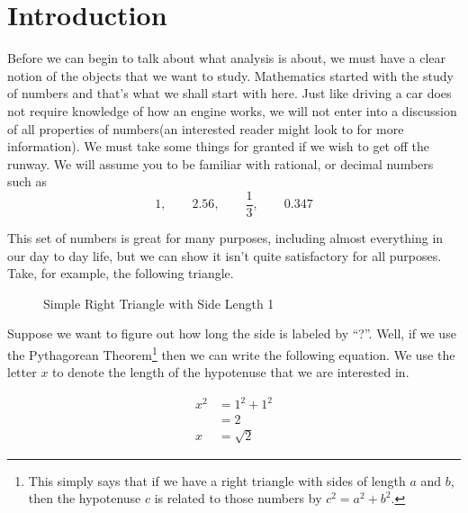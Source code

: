 \documentclass[../../templates/section]{subfiles}
\begin{document}
\section{Introduction}\label{sec:introduction}

Before we can begin to talk about what analysis is about, we must have a clear
notion of the objects that we want to study. Mathematics started with the study
of numbers and that's what we shall start with here. Just like driving a car
does not require knowledge of how an engine works, we will not enter into a
discussion of all properties of numbers(an interested reader might look to
 for more information). We
must take some things for granted if we wish to get off the runway. We will
assume you to be familiar with rational, or decimal numbers such as
\begin{equation}\label{eq:numbers}
1, \qquad 2.56, \qquad \frac{1}{3}, \qquad 0.347
\end{equation}

This set of numbers is great for many purposes, including almost everything in
our day to day life, but we can show it isn't quite satisfactory for all
purposes. Take, for example, the following triangle.

\begin{figure}\label{fig:right-triangle}
    \centering
    \caption{Simple Right Triangle with Side Length 1}
\end{figure}

Suppose we want to figure out how long the side is labeled by ``?''. Well, if
we use the Pythagorean Theorem\footnote{This simply says that if we have a
right triangle with sides of length $a$ and $b$, then the hypotenuse $c$ is
related to those numbers by $c^2 = a^2 + b^2$.} then we can write the following
equation. We use the letter $x$ to denote the length of the hypotenuse that we
are interested in. 

\begin{align}
    x^2 & = 1^2 + 1^2 \nonumber \\ 
        & = 2         \nonumber \\ 
    x   & = \sqrt{2}  \label{eq:sqrt2}
\end{align}
\end{document}
